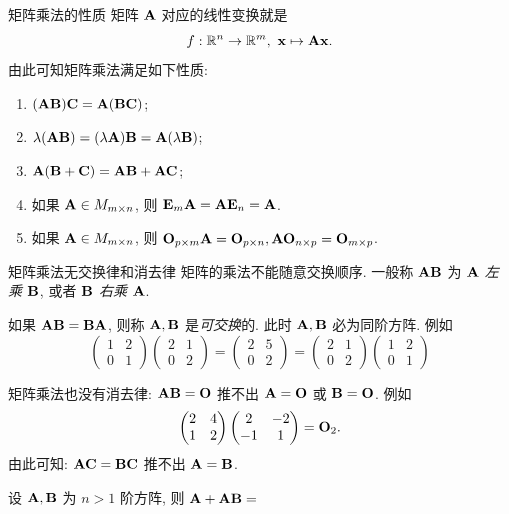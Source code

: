 \begin{frame}{矩阵乘法的性质}
	\onslide<+->
	矩阵 ${\mathbf{A}}$ 对应的线性变换就是
	\[f:{\mathbb{R}}^n\to{\mathbb{R}}^m,\ {\mathbf{x}}\mapsto {\mathbf{A}}{\mathbf{x}}.\]
	\onslide<+->
	由此可知矩阵乘法满足如下性质:
	\begin{enumerate}
		\item $({\mathbf{A}}{\mathbf{B}}){\mathbf{C}}={\mathbf{A}}({\mathbf{B}}{\mathbf{C}})$;
		\item $\lambda({\mathbf{A}}{\mathbf{B}})=(\lambda{\mathbf{A}}){\mathbf{B}}={\mathbf{A}}(\lambda{\mathbf{B}})$;
		\item ${\mathbf{A}}({\mathbf{B}}+{\mathbf{C}})={\mathbf{A}}{\mathbf{B}}+{\mathbf{A}}{\mathbf{C}}$;
		\item 如果 ${\mathbf{A}}\in M_{m\times n}$, 则 ${\mathbf{E}}_m {\mathbf{A}}={\mathbf{A}}{\mathbf{E}}_n={\mathbf{A}}$.
		\item 如果 ${\mathbf{A}}\in M_{m\times n}$, 则 ${\mathbf{O}}_{p\times m} {\mathbf{A}}={\mathbf{O}}_{p\times n}, {\mathbf{A}}{\mathbf{O}}_{n\times p}={\mathbf{O}}_{m\times p}$.
	\end{enumerate}
\end{frame}


\begin{frame}{矩阵乘法无交换律和消去律}
	\onslide<+->
	\alert{矩阵的乘法不能随意交换顺序}.
	\onslide<+->
	一般称 ${\mathbf{A}}{\mathbf{B}}$ 为 \emph{${\mathbf{A}}$ 左乘 ${\mathbf{B}}$}, 或者 \emph{${\mathbf{B}}$ 右乘 ${\mathbf{A}}$}.

	\onslide<+->
	如果 ${\mathbf{A}}{\mathbf{B}}={\mathbf{B}}{\mathbf{A}}$, 则称 ${\mathbf{A}},{\mathbf{B}}$ 是\emph{可交换}的.
	\onslide<+->
	此时 ${\mathbf{A}},{\mathbf{B}}$ \alert{必为同阶方阵}.
	\onslide<+->
	例如
	\[\begin{pmatrix}
		1&2\\0&1
	\end{pmatrix}\begin{pmatrix}
		2&1\\0&2
	\end{pmatrix}=\begin{pmatrix}
		2&5\\0&2
	\end{pmatrix}=\begin{pmatrix}
		2&1\\0&2
	\end{pmatrix}\begin{pmatrix}
		1&2\\0&1
	\end{pmatrix}\]

	\onslide<+->
	矩阵乘法也没有消去律: ${\mathbf{A}}{\mathbf{B}}={\mathbf{O}}$ 推不出 ${\mathbf{A}}={\mathbf{O}}$ 或 ${\mathbf{B}}={\mathbf{O}}$.
	\onslide<+->
	例如
	\[\begin{pmatrix}
		2&4\\1&2
	\end{pmatrix}\begin{pmatrix}
		2&-2\\-1&1
	\end{pmatrix}={\mathbf{O}}_2.\]
	\onslide<+->
	由此可知: ${\mathbf{A}}{\mathbf{C}}={\mathbf{B}}{\mathbf{C}}$ 推不出 ${\mathbf{A}}={\mathbf{B}}$. 

	\onslide<+->
	\begin{exercise}
		设 ${\mathbf{A}},{\mathbf{B}}$ 为 $n>1$ 阶方阵, 则 ${\mathbf{A}}+{\mathbf{A}}{\mathbf{B}}=$
	\end{exercise}
\end{frame}


